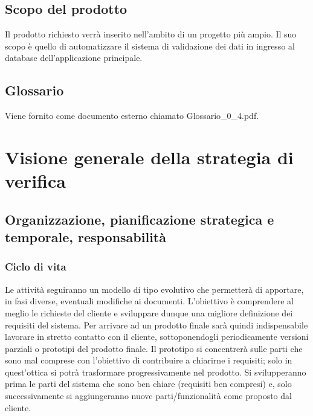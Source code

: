 \documentclass[11pt,titlepage,a4paper]{report}
\begin{document}
\section{Scopo del prodotto}
Il prodotto richiesto verr\`a inserito nell'ambito di un progetto pi\`u ampio. Il suo scopo \`e quello di automatizzare il sistema di validazione dei dati in ingresso al database dell'applicazione principale.

\section{Glossario}
Viene fornito come documento esterno chiamato Glossario\_0\_4.pdf.

\chapter[Strategia di verifica]{Visione generale della strategia di verifica}

\section[Organizzazione, pianificazione, responsabilit\`a]{Organizzazione, pianificazione strategica e temporale, responsabilit\`a}
\subsection{Ciclo di vita}
Le attivit\`a seguiranno un modello di tipo evolutivo che permetter\`a di apportare, in fasi diverse, eventuali modifiche ai documenti. L'obiettivo \`e comprendere al meglio le richieste del cliente e sviluppare dunque una migliore definizione dei requisiti del sistema. Per arrivare ad un prodotto finale sar\`a quindi indispensabile lavorare in stretto contatto con il cliente, sottoponendogli periodicamente versioni parziali o prototipi del prodotto finale. Il prototipo si concentrer\`a sulle parti che sono mal comprese con l'obiettivo di contribuire a chiarirne i requisiti; solo in quest'ottica si potr\`a trasformare progressivamente nel prodotto. Si svilupperanno prima le parti del sistema che sono ben chiare (requisiti ben compresi) e, solo successivamente si aggiungeranno nuove parti/funzionalit\`a come proposto dal cliente. 
\end{document}

